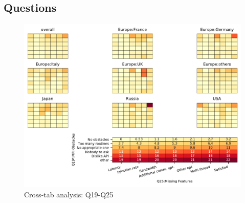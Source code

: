 
\subsection{Questions}


\begin{figure}
\begin{center}
\includegraphics[width=12cm]{../pdfs/Q19-Q25.pdf}
\caption{Cross-tab analysis: Q19-Q25}
\label{fig:Q19-Q25}
\end{center}
\end{figure}
